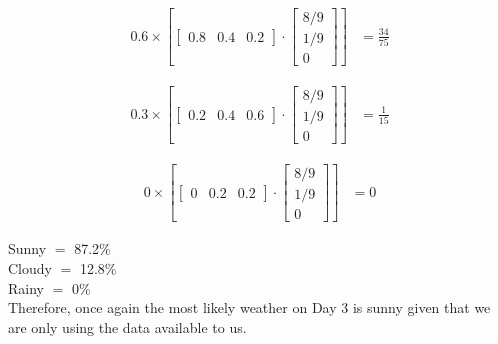 \documentclass[answers]{exam}
\begin{document}
\begin{questions}
\begin{parts}
\begin{solution}
            \begin{align*}
                0.6 \times \left[\begin{bmatrix} 0.8 & 0.4 & 0.2 \end{bmatrix} \cdot \begin{bmatrix}
                    8/9 \\
                    1/9 \\
                    0
                \end{bmatrix}\right] &= \frac{34}{75}
            \end{align*}
            
            \begin{align*}
                0.3 \times \left[\begin{bmatrix} 0.2 & 0.4 & 0.6 \end{bmatrix} \cdot \begin{bmatrix}
                    8/9 \\
                    1/9 \\
                    0
                \end{bmatrix}\right] &= \frac{1}{15}
            \end{align*}

            \begin{align*}
                0 \times \left[\begin{bmatrix} 0 & 0.2 & 0.2 \end{bmatrix} \cdot \begin{bmatrix}
                    8/9 \\
                    1/9 \\
                    0
                \end{bmatrix}\right] &= 0
            \end{align*}

            Sunny $=$ 87.2\% \\
            Cloudy $=$ 12.8\% \\
            Rainy $=$ 0\% \\

            Therefore, once again the most likely weather on Day 3 is sunny given that we are only using the data available to us.


\end{solution}
\end{parts}
\end{questions}
\end{document}
